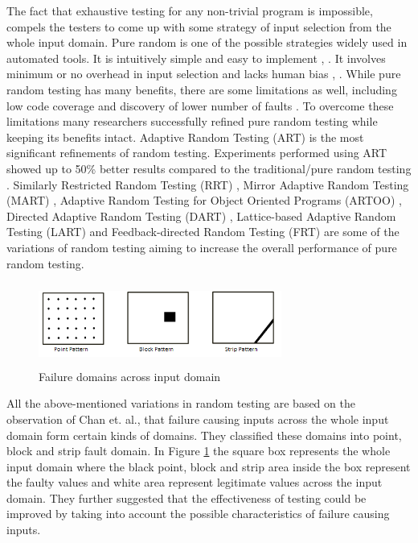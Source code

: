 \documentclass[runningheads,a4paper]{llncs}
\begin{document}
The fact that exhaustive testing for any non-trivial program is impossible, compels the testers to come up with some strategy of input selection from the whole input domain. Pure random is one of the possible strategies widely used in automated tools. It is intuitively simple and easy to implement \cite{Ciupa2008},  \cite{Forrester2000}. It involves minimum or no overhead in input selection and lacks human bias \cite{Hamlet1994},  \cite{Linger1993}. While pure random testing has many benefits, there are some limitations as well, including low code coverage \cite{Offutt1996} and discovery of lower number of faults \cite{Chen1994}. To overcome these limitations many researchers successfully refined pure random testing while keeping its benefits intact. Adaptive Random Testing (ART) is the most significant refinements of random testing. Experiments performed using ART showed up to 50\% better results compared to the traditional/pure random testing  \cite{Chen2008}.  Similarly Restricted Random Testing (RRT) \cite{Chan2002}, Mirror Adaptive Random Testing (MART)  \cite{Chen2004}, Adaptive Random Testing for Object Oriented Programs (ARTOO) \cite{Ciupa2008}, Directed Adaptive Random Testing (DART)  \cite{Godefroid2005}, Lattice-based Adaptive Random Testing (LART) \cite{Mayer2005} and Feedback-directed Random Testing (FRT) \cite{Pacheco2007} are some of the variations of random testing aiming to increase the overall performance of pure random testing.

\begin{figure}[h]
 \centering
\includegraphics[width=8cm,height=2.7cm]{ART_Patterns.png}
\caption{Failure domains across input domain \cite{Chan1996}}
\label{fig:patterns}
\end{figure}


All the above-mentioned variations in random testing are based on the observation of Chan et. al.,  \cite{Chan1996} that failure causing inputs across the whole input domain form certain kinds of domains. They classified these domains into point, block and strip fault domain. In Figure \ref{fig:patterns} the square box represents the whole input domain where the black point, block and strip area inside the box represent the faulty values and white area represent legitimate values across the input domain. They further suggested that the effectiveness of testing could be improved by taking into account the possible characteristics of failure causing inputs.
\end{document}
